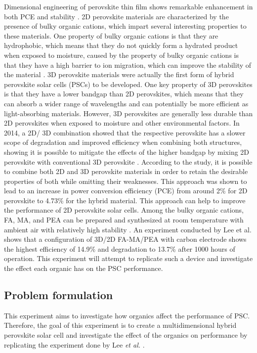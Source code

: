 Dimensional engineering of perovskite thin film shows remarkable enhancement in both PCE and stability \cite{mahmud_origin_2022}. 2D perovskite materials are characterized by the presence of bulky organic cations, which impart several interesting properties to these materials. One property of bulky organic cations is that they are hydrophobic, which means that they do not quickly form a hydrated product when exposed to moisture, caused by the property of bulky organic cations is that they have a high barrier to ion migration, which can improve the stability of the material \cite{chen_phase_2018}. 3D perovskite materials were actually the first form of hybrid perovskite solar cells (PSCs) to be developed. One key property of 3D perovskites is that they have a lower bandgap than 2D perovskites, which means that they can absorb a wider range of wavelengths and can potentially be more efficient as light-absorbing materials. However, 3D perovskites are generally less durable than 2D perovskites when exposed to moisture and other environmental factors. In 2014, a 2D/ 3D combination showed that the respective perovskite has a slower scope of degradation and improved efficiency when combining both structures, showing it is possible to mitigate the effects of the higher bandgap by mixing 2D perovskite with conventional 3D perovskite \cite{smith_layered_2014}. According to the study, it is possible to combine both 2D and 3D perovskite materials in order to retain the desirable properties of both while omitting their weaknesses. This approach was shown to lead to an increase in power conversion efficiency (PCE) from around 2\% for 2D perovskite to 4.73\% for the hybrid material. This approach can help to improve the performance of 2D perovskite solar cells. Among the bulky organic cations, FA, MA, and PEA can be prepared and synthesized at room temperature with ambient air with relatively high stability \cite{krishna_mixed_2019, chen_stabilizing_2017, grancini_one-year_2017, cao_2d_2015, mesquita_effect_2020}. An experiment conducted by Lee et al. shows that a configuration of 3D/2D FA-MA/PEA with carbon electrode shows the highest efficiency of 14.9\% and degradation to 13.7\% after 1000 hours of operation. This experiment will attempt to replicate such a device and investigate the effect each organic has on the PSC performance.
\subsection{Problem formulation}
This experiment aims to investigate how organics affect the performance of PSC. Therefore, the goal of this experiment is to create a multidimensional hybrid perovskite solar cell and investigate the effect of the organics on performance by replicating the experiment done by Lee \textit{et al.} \cite{lee_highly_2018}. 
